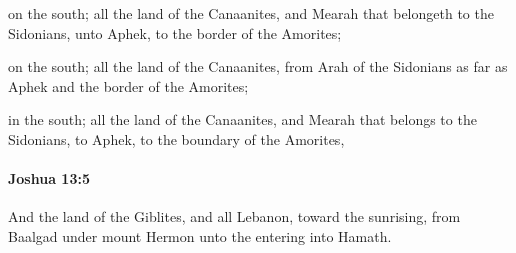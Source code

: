 			\begin{versebox}
					\item[BHS] 
					\item[ASV] on the south; all the land of the Canaanites, and Mearah that belongeth to the Sidonians, unto Aphek, to the border of the Amorites;
					\item[NIV] on the south; all the land of the Canaanites, from Arah of the Sidonians as far as Aphek and the border of the Amorites;
					\item[NRSV] in the south; all the land of the Canaanites, and Mearah that belongs to the Sidonians, to Aphek, to the boundary of the Amorites,
			\end{versebox}

		\paragraph{Joshua 13:5} %
			\label{JOSHUA-13-5}

			And the land of the Giblites, and all Lebanon, toward the sunrising, from Baalgad under mount Hermon unto the entering into Hamath.

